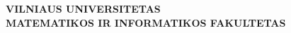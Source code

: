 \begin{titlepage}

\begin{center}



\MakeUppercase{\normalsize \textbf{Vilniaus universitetas}}\\
\MakeUppercase{\normalsize \textbf{Matematikos ir informatikos fakultetas}}\\
\MakeUppercase{\normalsize \textbf{\katedra}}\\[180pt]


\MakeUppercase{{ \normalsize \pavadinimas}}\\[24pt]
\MakeUppercase{{ \normalsize \engpavadinimas}}\\[24pt]

\normalsize \darbas \\ [24pt]

\linespread{1.3}

\vfill

\newcommand{\signature}[3][3ex]{%
  \par %
  \nopagebreak %
  \vspace{#1}%
  \noindent\makebox[#2]{\dotfill}%
  \\* %
  \noindent#3%
  \par %
  \vspace{#1}%
}
\def\mydots{\leavevmode\xleaders\hbox to 0.25em{\hfil.\hfil}\hfill\kern0pt}
\newcommand\tline[2]{
$\underset{\text{#1}}{\text{\underline{\hspace{#2}}}}$
}


\end{center}
\end{titlepage}
